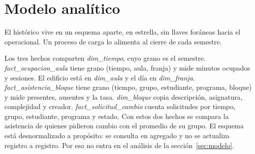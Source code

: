 \section{Modelo analítico}\label{sec:analitico}

El histórico vive en un esquema aparte, en estrella, sin llaves foráneas hacia el operacional. Un proceso de carga lo alimenta al cierre de cada semestre.


Los tres hechos comparten \emph{dim\_tiempo}, cuyo grano es el semestre. \emph{fact\_ocupacion\_aula} tiene grano (tiempo, aula, franja) y mide minutos ocupados y sesiones. El edificio está en \emph{dim\_aula} y el día en \emph{dim\_franja}. \emph{fact\_asistencia\_bloque} tiene grano (tiempo, grupo, estudiante, programa, bloque) y mide presentes, ausentes y la tasa. \emph{dim\_bloque} copia descripción, asignatura, complejidad y creador. \emph{fact\_solicitud\_cambio} cuenta solicitudes por tiempo, grupo, estudiante, programa y estado. Con estos dos hechos se compara la asistencia de quienes pidieron cambio con el promedio de su grupo. El esquema está desnormalizado a propósito: se consulta en agregado y no se actualiza registro a registro. Por eso no entra en el análisis de la sección~\ref{sec:modelo}.
